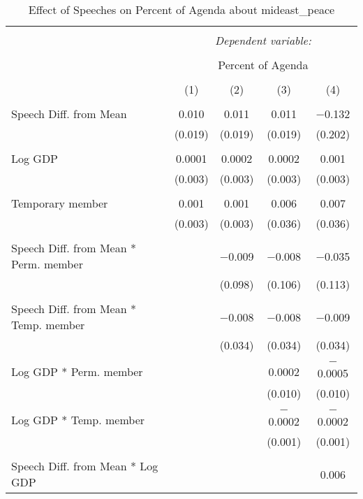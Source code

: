 
\begin{table}[!htbp] \centering 
  \caption{Effect of Speeches on Percent of Agenda about mideast_peace} 
  \label{} 
\begin{tabular}{@{\extracolsep{5pt}}lcccc} 
\\[-1.8ex]\hline 
\hline \\[-1.8ex] 
 & \multicolumn{4}{c}{\textit{Dependent variable:}} \\ 
\cline{2-5} 
\\[-1.8ex] & \multicolumn{4}{c}{Percent of Agenda} \\ 
\\[-1.8ex] & (1) & (2) & (3) & (4)\\ 
\hline \\[-1.8ex] 
 Speech Diff. from Mean & 0.010 & 0.011 & 0.011 & $-$0.132 \\ 
  & (0.019) & (0.019) & (0.019) & (0.202) \\ 
  & & & & \\ 
 Log GDP & 0.0001 & 0.0002 & 0.0002 & 0.001 \\ 
  & (0.003) & (0.003) & (0.003) & (0.003) \\ 
  & & & & \\ 
 Temporary member & 0.001 & 0.001 & 0.006 & 0.007 \\ 
  & (0.003) & (0.003) & (0.036) & (0.036) \\ 
  & & & & \\ 
 Speech Diff. from Mean * Perm. member &  & $-$0.009 & $-$0.008 & $-$0.035 \\ 
  &  & (0.098) & (0.106) & (0.113) \\ 
  & & & & \\ 
 Speech Diff. from Mean * Temp. member &  & $-$0.008 & $-$0.008 & $-$0.009 \\ 
  &  & (0.034) & (0.034) & (0.034) \\ 
  & & & & \\ 
 Log GDP * Perm. member &  &  & 0.0002 & $-$0.0005 \\ 
  &  &  & (0.010) & (0.010) \\ 
  & & & & \\ 
 Log GDP * Temp. member &  &  & $-$0.0002 & $-$0.0002 \\ 
  &  &  & (0.001) & (0.001) \\ 
  & & & & \\ 
 Speech Diff. from Mean * Log GDP &  &  &  & 0.006 \\ 

\end{tabular}
\end{table}
